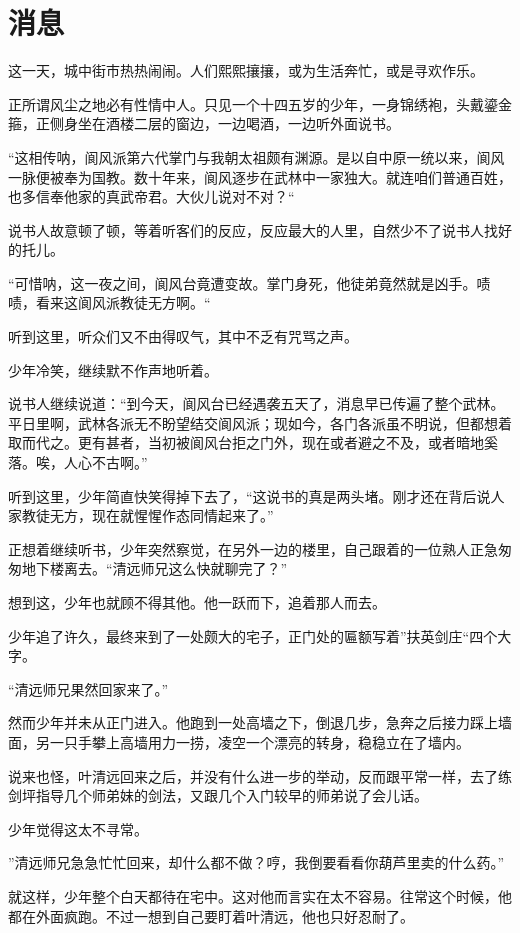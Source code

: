 \chapter{消息}
这一天，城中街市热热闹闹。人们熙熙攘攘，或为生活奔忙，或是寻欢作乐。

正所谓风尘之地必有性情中人。只见一个十四五岁的少年，一身锦绣袍，头戴鎏金箍，正侧身坐在酒楼二层的窗边，一边喝酒，一边听外面说书。

“这相传呐，阆风派第六代掌门与我朝太祖颇有渊源。是以自中原一统以来，阆风一脉便被奉为国教。数十年来，阆风逐步在武林中一家独大。就连咱们普通百姓，也多信奉他家的真武帝君。大伙儿说对不对？“

说书人故意顿了顿，等着听客们的反应，反应最大的人里，自然少不了说书人找好的托儿。

“可惜呐，这一夜之间，阆风台竟遭变故。掌门身死，他徒弟竟然就是凶手。啧啧，看来这阆风派教徒无方啊。“

听到这里，听众们又不由得叹气，其中不乏有咒骂之声。

少年冷笑，继续默不作声地听着。

说书人继续说道：“到今天，阆风台已经遇袭五天了，消息早已传遍了整个武林。平日里啊，武林各派无不盼望结交阆风派；现如今，各门各派虽不明说，但都想着取而代之。更有甚者，当初被阆风台拒之门外，现在或者避之不及，或者暗地奚落。唉，人心不古啊。”

听到这里，少年简直快笑得掉下去了，“这说书的真是两头堵。刚才还在背后说人家教徒无方，现在就惺惺作态同情起来了。”

正想着继续听书，少年突然察觉，在另外一边的楼里，自己跟着的一位熟人正急匆匆地下楼离去。“清远师兄这么快就聊完了？”

想到这，少年也就顾不得其他。他一跃而下，追着那人而去。

少年追了许久，最终来到了一处颇大的宅子，正门处的匾额写着”扶英剑庄“四个大字。

“清远师兄果然回家来了。”

然而少年并未从正门进入。他跑到一处高墙之下，倒退几步，急奔之后接力踩上墙面，另一只手攀上高墙用力一捞，凌空一个漂亮的转身，稳稳立在了墙内。

说来也怪，叶清远回来之后，并没有什么进一步的举动，反而跟平常一样，去了练剑坪指导几个师弟妹的剑法，又跟几个入门较早的师弟说了会儿话。

少年觉得这太不寻常。

”清远师兄急急忙忙回来，却什么都不做？哼，我倒要看看你葫芦里卖的什么药。”

就这样，少年整个白天都待在宅中。这对他而言实在太不容易。往常这个时候，他都在外面疯跑。不过一想到自己要盯着叶清远，他也只好忍耐了。

